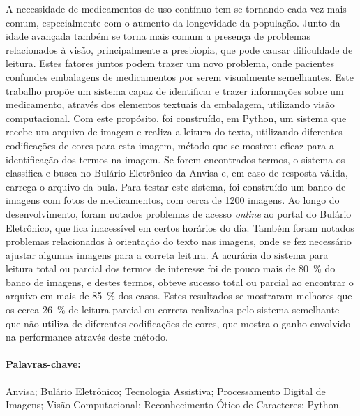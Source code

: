 A necessidade de medicamentos de uso contínuo tem se tornando cada vez mais comum, especialmente com o aumento da longevidade da população.
Junto da idade avançada também se torna mais comum a presença de problemas relacionados à visão, principalmente a presbiopia, que pode causar dificuldade de leitura.
Estes fatores juntos podem trazer um novo problema, onde pacientes confundes embalagens de medicamentos por serem visualmente semelhantes.
Este trabalho propõe um sistema capaz de identificar e trazer informações sobre um medicamento, através dos elementos textuais da embalagem, utilizando visão computacional.
Com este propósito, foi construído, em Python, um sistema que recebe um arquivo de imagem e realiza a leitura do texto, utilizando diferentes codificações de cores para esta imagem, método que se mostrou eficaz para a identificação dos termos na imagem.
Se forem encontrados termos, o sistema os classifica e busca no Bulário Eletrônico da Anvisa e, em caso de resposta válida, carrega o arquivo da bula.
Para testar este sistema, foi construído um banco de imagens com fotos de medicamentos, com cerca de \num{1200} imagens.
Ao longo do desenvolvimento, foram notados problemas de acesso \textit{online} ao portal do Bulário Eletrônico, que fica inacessível em certos horários do dia.
Também foram notados problemas relacionados à orientação do texto nas imagens, onde se fez necessário ajustar algumas imagens para a correta leitura.
A acurácia do sistema para leitura total ou parcial dos termos de interesse foi de pouco mais de \SI{80}{\percent} do banco de imagens, e destes termos, obteve sucesso total ou parcial ao encontrar o arquivo em mais de \SI{85}{\percent} dos casos.
Estes resultados se mostraram melhores que os cerca \SI{26}{\percent} de leitura parcial ou correta realizadas pelo sistema semelhante que não utiliza de diferentes codificações de cores, que mostra o ganho envolvido na performance através deste método.

\paragraph*{Palavras-chave:} Anvisa; Bulário Eletrônico; Tecnologia Assistiva; Processamento Digital de Imagens; Visão Computacional; Reconhecimento Ótico de Caracteres; Python.

